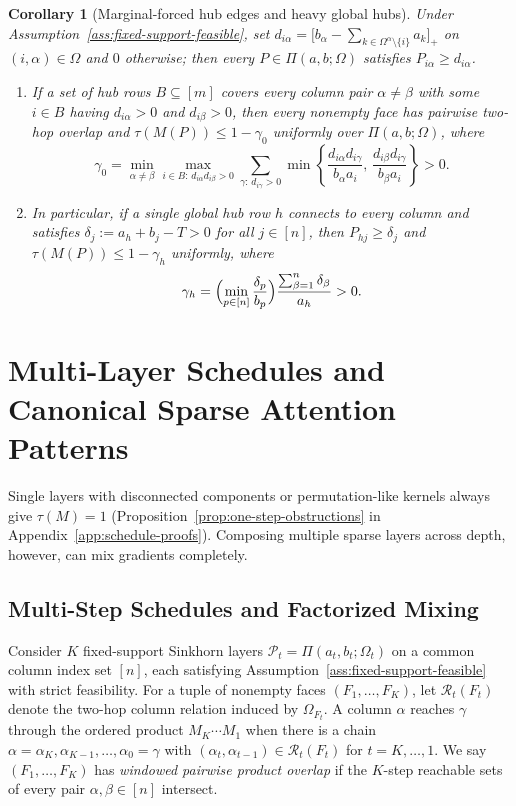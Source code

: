 \documentclass[10pt]{article}
\newtheorem{corollary}{Corollary}
\begin{document}
\begin{corollary}[Marginal-forced hub edges and heavy global hubs]
\label{cor:forced-hub-edges}
Under Assumption~\ref{ass:fixed-support-feasible}, set $d_{i\alpha} = \bigl[b_\alpha - \sum_{k \in \Omega^\alpha \setminus \{i\}} a_k\bigr]_+$ on $(i,\alpha)\in\Omega$ and $0$ otherwise; then every $P \in \Pi(a,b;\Omega)$ satisfies $P_{i\alpha} \ge d_{i\alpha}$.
\begin{enumerate}[leftmargin=1.5em]
  \item If a set of hub rows $B \subseteq [m]$ covers every column pair $\alpha \neq \beta$ with some $i \in B$ having $d_{i\alpha} > 0$ and $d_{i\beta} > 0$, then every nonempty face has pairwise two-hop overlap and $\tau(M(P)) \le 1 - \gamma_0$ uniformly over $\Pi(a,b;\Omega)$, where
  \[
    \gamma_0 = \min_{\alpha\neq\beta} \max_{i\in B:\, d_{i\alpha} d_{i\beta} > 0}
    \sum_{\gamma:\, d_{i\gamma} > 0} \min\!\left\{\frac{d_{i\alpha} d_{i\gamma}}{b_\alpha a_i},\, \frac{d_{i\beta} d_{i\gamma}}{b_\beta a_i}\right\} > 0.
  \]
  \item In particular, if a single global hub row $h$ connects to every column and satisfies $\delta_j := a_h + b_j - T > 0$ for all $j \in [n]$, then $P_{hj} \ge \delta_j$ and $\tau(M(P)) \le 1 - \gamma_h$ uniformly, where
  \[
    \gamma_h = \Bigl(\min_{p \in [n]} \frac{\delta_p}{b_p}\Bigr) \frac{\sum_{\beta=1}^n \delta_\beta}{a_h} > 0.
  \]
\end{enumerate}
\end{corollary}

\section{Multi-Layer Schedules and Canonical Sparse Attention Patterns}
\label{sec:schedules}

Single layers with disconnected components or permutation-like kernels always give $\tau(M) = 1$ (Proposition~\ref{prop:one-step-obstructions} in Appendix~\ref{app:schedule-proofs}). Composing multiple sparse layers across depth, however, can mix gradients completely.

\subsection{Multi-Step Schedules and Factorized Mixing}

Consider $K$ fixed-support Sinkhorn layers $\mathcal{P}_t = \Pi(a_t, b_t; \Omega_t)$ on a common column index set $[n]$, each satisfying Assumption~\ref{ass:fixed-support-feasible} with strict feasibility. For a tuple of nonempty faces $(F_1,\dots,F_K)$, let $\mathcal{R}_t(F_t)$ denote the two-hop column relation induced by $\Omega_{F_t}$. A column $\alpha$ reaches $\gamma$ through the ordered product $M_K \cdots M_1$ when there is a chain $\alpha = \alpha_K, \alpha_{K-1}, \dots, \alpha_0 = \gamma$ with $(\alpha_t, \alpha_{t-1}) \in \mathcal{R}_t(F_t)$ for $t = K, \dots, 1$. We say $(F_1,\dots,F_K)$ has \emph{windowed pairwise product overlap} if the $K$-step reachable sets of every pair $\alpha, \beta \in [n]$ intersect.
\end{document}
